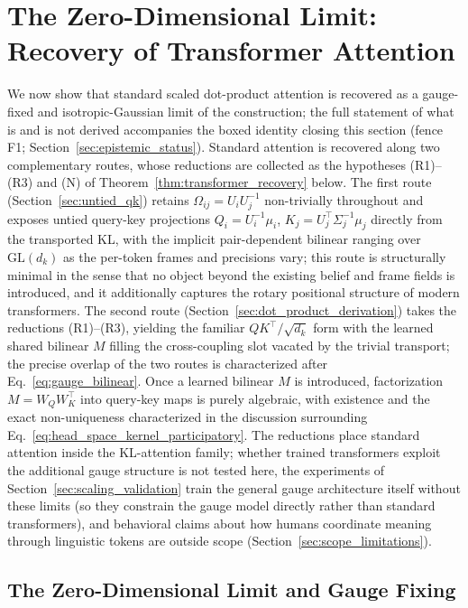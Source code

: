 \section{The Zero-Dimensional Limit: Recovery of Transformer Attention}\label{sec:transformers}

We now show that standard scaled dot-product attention is recovered as a gauge-fixed and isotropic-Gaussian limit of the construction; the full statement of what is and is not derived accompanies the boxed identity closing this section (fence F1; Section~\ref{sec:epistemic_status}). Standard attention is recovered along two complementary routes, whose reductions are collected as the hypotheses (R1)--(R3) and (N) of Theorem~\ref{thm:transformer_recovery} below. The first route (Section~\ref{sec:untied_qk}) retains $\Omega_{ij} = U_iU_j^{-1}$ non-trivially throughout and exposes untied query-key projections $Q_i = U_i^{-1}\mu_i$, $K_j = U_j^\top\Sigma_j^{-1}\mu_j$ directly from the transported KL, with the implicit pair-dependent bilinear ranging over $\mathrm{GL}(d_k)$ as the per-token frames and precisions vary; this route is structurally minimal in the sense that no object beyond the existing belief and frame fields is introduced, and it additionally captures the rotary positional structure of modern transformers. The second route (Section~\ref{sec:dot_product_derivation}) takes the reductions (R1)--(R3), yielding the familiar $QK^\top/\sqrt{d_k}$ form with the learned shared bilinear $M$ filling the cross-coupling slot vacated by the trivial transport; the precise overlap of the two routes is characterized after Eq.~\eqref{eq:gauge_bilinear}. Once a learned bilinear $M$ is introduced, factorization $M = W_QW_K^\top$ into query-key maps is purely algebraic, with existence and the exact non-uniqueness characterized in the discussion surrounding Eq.~\eqref{eq:head_space_kernel_participatory}. The reductions place standard attention inside the KL-attention family; whether trained transformers exploit the additional gauge structure is not tested here, the experiments of Section~\ref{sec:scaling_validation} train the general gauge architecture itself without these limits (so they constrain the gauge model directly rather than standard transformers), and behavioral claims about how humans coordinate meaning through linguistic tokens are outside scope (Section~\ref{sec:scope_limitations}).

\subsection{The Zero-Dimensional Limit and Gauge Fixing}

